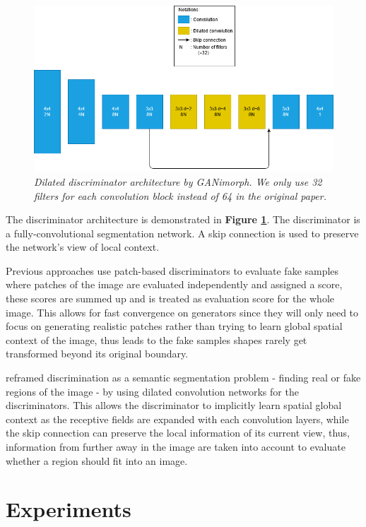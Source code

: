\documentclass[12pt]{report}
\begin{document}
\begin{figure}[h]
	\centering
	\includegraphics[scale=0.6]{discri-architecture}
	\caption{\textit{Dilated discriminator architecture by GANimorph\cite{ganimorph}. We only use 32 filters for each convolution block instead of 64 in the original paper.}}
	\label{fig:discri-architecture}
\end{figure}

The discriminator architecture is demonstrated in \textbf{Figure \ref{fig:discri-architecture}}. The discriminator is a fully-convolutional segmentation network. A skip connection is used to preserve the network's view of local context.

Previous approaches \cite{cycle-gan}\cite{disco-gan} use patch-based discriminators to evaluate fake samples where patches of the image are evaluated independently and assigned a score, these scores are summed up and is treated as evaluation score for the whole image. This allows for fast convergence on generators since they will only need to focus on generating realistic patches rather than trying to learn global spatial context of the image, thus leads to the fake samples shapes rarely get transformed beyond its original boundary.

\cite{ganimorph} reframed discrimination as a semantic segmentation problem - finding real or fake regions of the image - by using dilated convolution networks for the discriminators. This allows the discriminator to implicitly learn spatial global context as the receptive fields are expanded with each convolution layers, while the skip connection can preserve the local information of its current view, thus, information from further away in the image are taken into account to evaluate whether a region should fit into an image.

\chapter{Experiments}
\label{chap:experiments}
\end{document}
